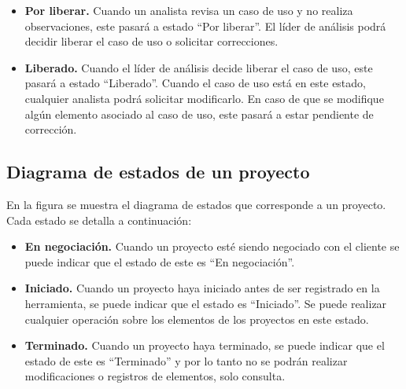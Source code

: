 \begin{itemize}
 \item {\bf Por liberar.} Cuando un analista revisa un caso de uso y no realiza observaciones, este pasará a estado ``Por liberar''. El líder de análisis podrá
 decidir liberar el caso de uso o solicitar correcciones.

 \item {\bf Liberado.} Cuando el líder de análisis decide liberar el caso de uso, este pasará a estado ``Liberado''. Cuando el caso de uso está en este estado, cualquier analista podrá solicitar modificarlo. En caso de que se modifique algún elemento asociado al caso de uso, este pasará a estar pendiente de corrección.

\end{itemize}

\subsection{Diagrama de estados de un proyecto}

En la figura  se muestra el diagrama de estados que corresponde a un proyecto. Cada estado se
detalla a continuación:


\begin{itemize}
 \item {\bf En negociación.} Cuando un proyecto esté siendo negociado con el cliente se puede indicar 
 que el estado de este es ``En negociación''. 
 \item {\bf Iniciado.} Cuando un proyecto haya iniciado antes de ser registrado en la herramienta, se puede indicar que el estado es ``Iniciado''.
 Se puede realizar cualquier operación sobre los elementos de los proyectos en este estado.
 \item {\bf Terminado.} Cuando un proyecto haya terminado, se puede indicar que el estado de este es ``Terminado'' y por lo tanto no se podrán realizar
 modificaciones o registros de elementos, solo consulta.
\end{itemize}

